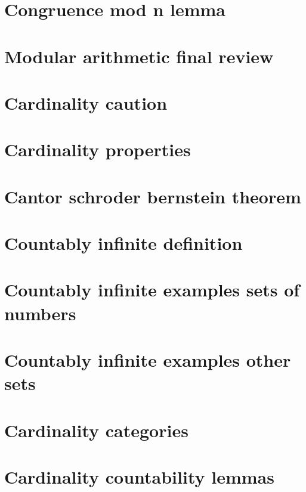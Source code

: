 \section*{Congruence mod n lemma}

\vfill
\section*{Modular arithmetic final review}

\vfill
\section*{Cardinality caution}

\vfill
\section*{Cardinality properties}

\vfill
\section*{Cantor schroder bernstein theorem}

\vfill
\section*{Countably infinite definition}

\vfill
\section*{Countably infinite examples sets of numbers}

\vfill
\section*{Countably infinite examples other sets}

\vfill
\section*{Cardinality categories}

\vfill
\section*{Cardinality countability lemmas}

\vfill
